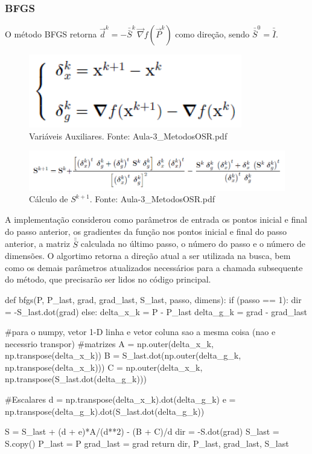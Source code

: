 \documentclass[10pt, a4paper]{article}
\begin{document}
\subsubsection{BFGS}

O método BFGS retorna $\overrightarrow{d}^k = -\bar{\bar{S}}^k\,\overrightarrow{\nabla}f(\overrightarrow{P}^k)$ como direção, sendo $\bar{\bar{S}}^0 = \bar{\bar{I}}$.

\begin{figure}[htpb]
  \centering
  \includegraphics[scale=0.5]{figuras/bfgs_auxiliares.PNG}
  \caption{Variáveis Auxiliares. Fonte: Aula-3\_MetodosOSR.pdf}
\end{figure}

\begin{figure}[htpb]
  \centering
  \includegraphics[scale=0.5]{figuras/bfgs_sk.PNG}
  \caption{Cálculo de $S^{k+1}$. Fonte: Aula-3\_MetodosOSR.pdf}
\end{figure}

A implementação considerou como parâmetros de entrada os pontos inicial e final do passo anterior, os gradientes da função nos pontos inicial e final do passo anterior,
a matriz $\bar{\bar{S}}$ calculada no último passo, o número do passo e o número de dimensões. O algortimo retorna a direção atual a ser utilizada na busca, bem como os
demais parâmetros atualizados necessários para a chamada subsequente do método, que precisarão ser lidos no código principal.

\begin{python}
  def bfgs(P, P_last, grad, grad_last, S_last, passo, dimens):
    if (passo == 1):
        dir = -S_last.dot(grad)
    else:
        delta_x_k = P - P_last
        delta_g_k = grad - grad_last
        
        #para o numpy, vetor 1-D linha e vetor coluna sao a mesma coisa (nao e necessrio transpor)
        #matrizes
        A = np.outer(delta_x_k, np.transpose(delta_x_k))
        B = S_last.dot(np.outer(delta_g_k, np.transpose(delta_x_k)))
        C = np.outer(delta_x_k, np.transpose(S_last.dot(delta_g_k)))
        
        #Escalares        
        d = np.transpose(delta_x_k).dot(delta_g_k)
        e = np.transpose(delta_g_k).dot(S_last.dot(delta_g_k))
                
        S = S_last + (d + e)*A/(d**2) - (B + C)/d
        dir = -S.dot(grad)
        S_last = S.copy()
    P_last = P
    grad_last = grad
    return dir, P_last, grad_last, S_last
\end{python}
\end{document}
